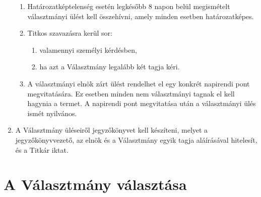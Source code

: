 \documentclass{rulebook}
\begin{document}
\begin{enumerate}
\begin{enumerate}
		\item Határozatképtelenség esetén legkésőbb 8 napon belül megismételt választmányi ülést kell összehívni, amely minden esetben határozatképes.
		\item Titkos szavazásra kerül sor:
		\begin{enumerate}
			\item valamennyi személyi kérdésben,
			\item ha azt a Választmány legalább két tagja kéri.
		\end{enumerate}
		\item 	A választmányi elnök zárt ülést rendelhet el egy konkrét napirendi pont megvitatására. Ez esetben minden nem választmányi tagnak el kell hagynia a termet. A napirendi pont megvitatása után a választmányi ülés ismét nyilvános.
	\end{enumerate}
	\item A Választmány üléseiről jegyzőkönyvet kell készíteni, melyet a jegyzőkönyvvezető, az elnök és a Választmány egyik tagja aláírásával hitelesít, és a Titkár iktat.
	
\end{enumerate}


\section{A Választmány választása}
\end{document}
